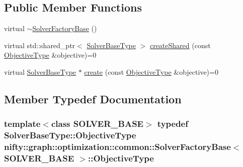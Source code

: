 \subsection*{Public Member Functions}
\begin{DoxyCompactItemize}
\item 
virtual \hyperlink{classnifty_1_1graph_1_1optimization_1_1common_1_1SolverFactoryBase_a939801ccfeb621ed967a5638ad726719}{$\sim$\+Solver\+Factory\+Base} ()
\item 
virtual std\+::shared\+\_\+ptr$<$ \hyperlink{classnifty_1_1graph_1_1optimization_1_1common_1_1SolverFactoryBase_a32303ac07d31050bd56939ba09332a8c}{Solver\+Base\+Type} $>$ \hyperlink{classnifty_1_1graph_1_1optimization_1_1common_1_1SolverFactoryBase_ad8946541bdc12fcd340c3049662d8f59}{create\+Shared} (const \hyperlink{classnifty_1_1graph_1_1optimization_1_1common_1_1SolverFactoryBase_addf5fe831de3b6d9e3473eee67490a5c}{Objective\+Type} \&objective)=0
\item 
virtual \hyperlink{classnifty_1_1graph_1_1optimization_1_1common_1_1SolverFactoryBase_a32303ac07d31050bd56939ba09332a8c}{Solver\+Base\+Type} $\ast$ \hyperlink{classnifty_1_1graph_1_1optimization_1_1common_1_1SolverFactoryBase_a192c772512ac9da7e4164d9ca5cc5d95}{create} (const \hyperlink{classnifty_1_1graph_1_1optimization_1_1common_1_1SolverFactoryBase_addf5fe831de3b6d9e3473eee67490a5c}{Objective\+Type} \&objective)=0
\end{DoxyCompactItemize}


\subsection{Member Typedef Documentation}
\hypertarget{classnifty_1_1graph_1_1optimization_1_1common_1_1SolverFactoryBase_addf5fe831de3b6d9e3473eee67490a5c}{}
\subsubsection[{Objective\+Type}]{\setlength{\rightskip}{0pt plus 5cm}template$<$class S\+O\+L\+V\+E\+R\+\_\+\+B\+A\+S\+E$>$ typedef Solver\+Base\+Type\+::\+Objective\+Type {\bf nifty\+::graph\+::optimization\+::common\+::\+Solver\+Factory\+Base}$<$ S\+O\+L\+V\+E\+R\+\_\+\+B\+A\+S\+E $>$\+::{\bf Objective\+Type}}\label{classnifty_1_1graph_1_1optimization_1_1common_1_1SolverFactoryBase_addf5fe831de3b6d9e3473eee67490a5c}
\hypertarget{classnifty_1_1graph_1_1optimization_1_1common_1_1SolverFactoryBase_a32303ac07d31050bd56939ba09332a8c}{}

